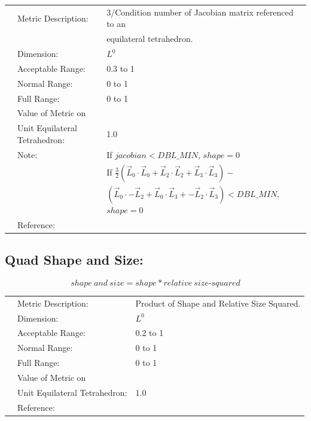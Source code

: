 \documentclass[12pt]{article}
\begin{document}
\begin{tabular}{lll}
& Metric Description:  & 3/Condition number of Jacobian matrix referenced to an \\
&                      & equilateral tetrahedron. \\
& Dimension:           & $L^0$  \\ 
& Acceptable Range:    & 0.3 to 1 \\ 
& Normal Range:        & 0 to 1 \\ 
& Full Range:          & 0 to 1 \\ 
& Value of Metric on   &  \\
& Unit Equilateral Tetrahedron:    & 1.0 \\ 
& Note:                & If $jacobian < DBL\_MIN$, $shape = 0$  \\
&                      & If $\frac {3}{2} \left( \vec L_0 \cdot \vec L_0 +
                      \vec L_2 \cdot \vec L_2 +
                      \vec L_3 \cdot \vec L_3  \right) - $ \\
&                      & $\left( \vec L_0 \cdot -\vec L_2 +
                      \vec L_0 \cdot \vec L_3 +
                      -\vec L_2 \cdot \vec L_3 \right) < DBL\_MIN,$ $shape = 0$ \\
& Reference:           & \cite{three} \\
\end{tabular} 


\subsection*{Quad Shape and Size:}

\begin{displaymath}
shape~and~size = shape * relative~size \textrm{-}squared 
\end{displaymath}

\begin{tabular}{lll}
& Metric Description:  & Product of Shape and Relative Size Squared.\\ 
& Dimension:           & $L^0$       \\ 
& Acceptable Range:    & 0.2 to 1 \\ 
& Normal Range:        & 0 to 1 \\ 
& Full Range:          & 0 to 1 \\ 
& Value of Metric on   &  \\
& Unit Equilateral Tetrahedron:    & 1.0 \\ 
& Reference:           & \cite{three} \\
\end{tabular} 
\end{document}
